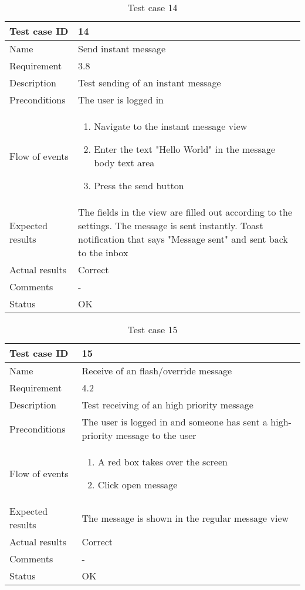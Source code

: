 		\begin{table}[htb]
			\begin{tabular}{l|p{10cm}}
				Test case ID & 14 \\ \hline
				Name & Send instant message\\ \hline
				Requirement & 3.8\\ \hline
				Description & Test sending of an instant message\\ \hline
				Preconditions & The user is logged in\\ \hline
				Flow of events & 
					\begin{enumerate}
						\item{}Navigate to the instant message view
						\item{}Enter the text "Hello World" in the message body text area
						\item{}Press the send button
					\end{enumerate} \\ \hline
				Expected results & The fields in the view are filled out according to the settings. The message is sent instantly. Toast notification that says "Message sent" and sent back to the inbox \\ \hline
				Actual results & Correct\\ \hline
				Comments &-\\ \hline
				Status &OK \\ \hline
			\end{tabular}
			\caption{Test case 14} \label{tab:case14}
		\end{table}

		\begin{table}[htb]
			\begin{tabular}{l|p{10cm}}
				Test case ID & 15 \\ \hline
				Name & Receive of an flash/override message\\ \hline
				Requirement & 4.2\\ \hline
				Description & Test receiving of an high priority message\\ \hline
				Preconditions & The user is logged in and someone has sent a high-priority message to the user\\ \hline
				Flow of events & 
					\begin{enumerate}
						\item{}A red box takes over the screen
						\item{}Click open message
					\end{enumerate} \\ \hline
				Expected results & The message is shown in the regular message view\\ \hline
				Actual results & Correct\\ \hline
				Comments & -\\ \hline
				Status & OK \\ \hline
			\end{tabular}
			\caption{Test case 15} \label{tab:case15}
		\end{table}

